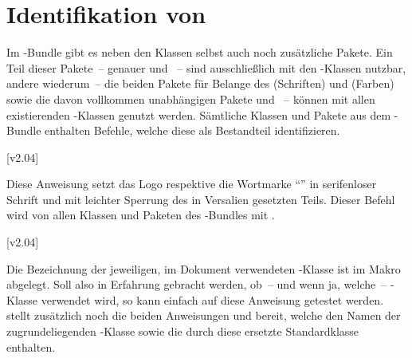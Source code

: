 \section{Identifikation von \TUDScript}

Im \TUDScript-Bundle gibt es neben den Klassen selbst auch noch zusätzliche 
Pakete. Ein Teil dieser Pakete~-- genauer  und 
~-- sind ausschließlich mit den \TUDScript-Klassen nutzbar,
andere wiederum~-- die beiden Pakete für Belange des \CDs {}
(Schriften) und  (Farben) sowie die davon vollkommen 
unabhängigen Pakete  und ~-- können mit 
allen existierenden -Klassen genutzt werden. Sämtliche 
Klassen und Pakete aus dem \TUDScript-Bundle enthalten Befehle, welche diese 
als Bestandteil identifizieren.

\begin{Declaration}
  {}
  [v2.04]
\printdeclarationlist

Diese Anweisung setzt das Logo respektive die Wortmarke \enquote{\TUDScript{}} 
in serifenloser Schrift und mit leichter Sperrung des in Versalien gesetzten 
Teils. Dieser Befehl wird von allen Klassen und Paketen des \TUDScript-Bundles 
mit .
\end{Declaration}

\begin{Declaration}
  {}
  [v2.04]
\printdeclarationlist

Die Bezeichnung der jeweiligen, im Dokument verwendeten \TUDScript-Klasse ist 
im Makro  abgelegt. Soll also in Erfahrung gebracht 
werden, ob~-- und wenn ja, welche~-- \TUDScript-Klasse verwendet wird, so kann 
einfach auf diese Anweisung getestet werden. \KOMAScript{} stellt zusätzlich 
noch die beiden Anweisungen  und  
bereit, welche den Namen der zugrundeliegenden \KOMAScript-Klasse sowie die 
durch diese ersetzte Standardklasse enthalten.
\end{Declaration}

